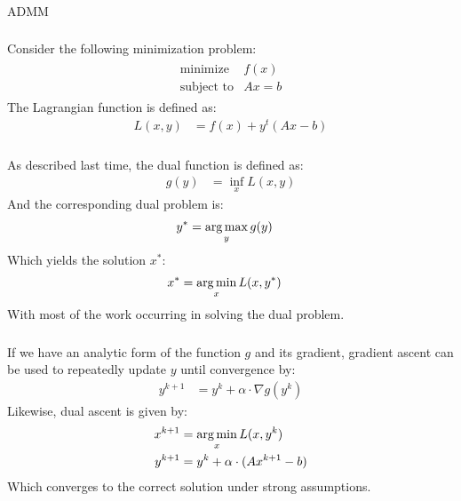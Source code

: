 \begin{frame}[fragile] \frametitle{}

\begin{flushright}
{\color{yaleblue}\sc\fontsize{1cm}{0cm}\selectfont ADMM}
\end{flushright}

\end{frame}


\begin{frame}[fragile] \frametitle{}

Consider the following minimization problem:
\begin{align*}
\begin{array}{ll}
\text{minimize} & f(x) \\
\text{subject to} & Ax = b
\end{array}
\end{align*}
\pause The Lagrangian function is defined as:
\begin{align*}
L(x,y) &= f(x) + y^t (Ax - b)
\end{align*}

\end{frame}

\begin{frame}[fragile] \frametitle{}

As described last time, the dual function is defined as:
\begin{align*}
g(y) &= \inf_x L(x,y)
\end{align*}
And the corresponding dual problem is:
\begin{align*}
y^{*} &= \mathop{\mathrm{arg\,max}}_y g(y)
\end{align*}
Which yields the solution $x^{*}$:
\begin{align*}
x^{*} &= \mathop{\mathrm{arg\,min}}_x L(x, y^{*})
\end{align*}
With most of the work occurring in solving the dual problem.

\end{frame}

\begin{frame}[fragile] \frametitle{}

If we have an analytic form of the function $g$ and its gradient,
gradient ascent can be used to repeatedly update $y$ until convergence
by:
\begin{align*}
y^{k+1} &= y^{k} + \alpha \cdot \nabla g (y^k)
\end{align*}
\pause Likewise, dual ascent is given by:
\begin{align*}
x^{k+1} &= \mathop{\mathrm{arg\,min}}_x L(x, y^k) \\
y^{k+1} &= y^{k} + \alpha \cdot (A x^{k+1} - b)
\end{align*}
Which converges to the correct solution under strong assumptions.

\end{frame}


